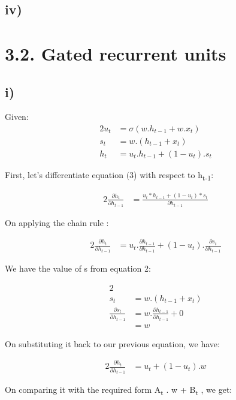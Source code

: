 \subsection*{iv)}


\section*{3.2. Gated recurrent units}
\subsection*{i)}

Given:
\begin{alignat}{2}
    u_t &= \sigma (w.h_{t-1} + w.x_t)
    \\s_t &= w. (h_{t-1} + x_t)
    \\h_t &= u_t. h_{t-1}  + (1-u_t) . s_t
\end{alignat}

First, let's differentiate equation \((3\)) with respect to h\textsubscript{t-1}:

\begin{alignat}{2}
\frac {\partial h_t}{\partial h_{t-1}} &= \frac {u_t * h_{t-1} + (1-u_t) * s_t}{\partial h_{t-1}}
\end{alignat}

On applying the chain rule : 

\begin{alignat}{2}
\frac {\partial h_t}{\partial h_{t-1}} &= u_t . \frac {\partial h_{t-1}}{\partial h_{t-1}} + (1-u_t).\frac {\partial s_t}{\partial h_{t-1}}
\end{alignat}

We have the value of s from equation 2:

\begin{alignat}{2}
\\s_t &= w. (h_{t-1} + x_t)
\\ \frac {\partial s_t}{\partial h_{t-1}} &= w.\frac{\partial h_{t-1}}{\partial h_{t-1}} + 0 
\\ &= w
\end{alignat}

On substituting it back to our previous equation, we have:

\begin{alignat}{2}
\frac {\partial h_t}{\partial h_{t-1}} &= u_t + (1-u_t).w
\end{alignat}

On comparing it with the required form A\textsubscript{t} . w + B\textsubscript{t} , we get:

